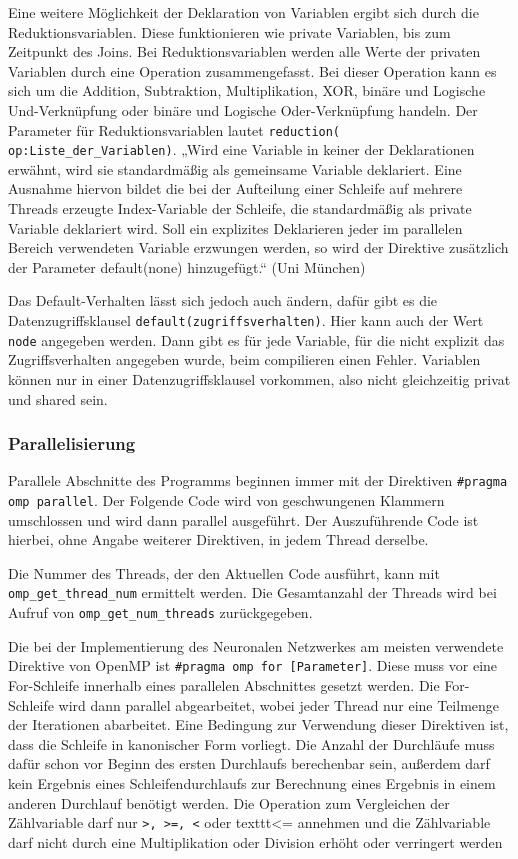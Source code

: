 \documentclass[../main.tex]{subfiles}
\begin{document}
Eine weitere Möglichkeit der Deklaration von Variablen ergibt sich durch die Reduktionsvariablen. Diese funktionieren wie private Variablen, bis zum Zeitpunkt des Joins. Bei Reduktionsvariablen werden alle Werte der privaten Variablen durch eine Operation zusammengefasst. Bei dieser Operation kann es sich um die Addition, Subtraktion, Multiplikation, XOR, binäre und Logische Und-Verknüpfung oder binäre und Logische Oder-Verknüpfung handeln. Der Parameter für Reduktionsvariablen lautet \texttt{reduction( op:Liste\_der\_Variablen)}.
„Wird eine Variable in keiner der Deklarationen erwähnt, wird sie standardmäßig als gemeinsame Variable deklariert. Eine Ausnahme hiervon bildet die bei der Aufteilung einer Schleife auf mehrere Threads erzeugte Index-Variable der Schleife, die standardmäßig als private Variable deklariert wird. Soll ein explizites Deklarieren jeder im parallelen Bereich verwendeten Variable erzwungen werden, so wird der Direktive zusätzlich der Parameter default(none) hinzugefügt.“ (Uni München)

Das Default-Verhalten lässt sich jedoch auch ändern, dafür gibt es die Datenzugriffsklausel \texttt{default(zugriffsverhalten)}. Hier kann auch der Wert \texttt{node} angegeben werden. Dann gibt es für jede Variable, für die nicht explizit das Zugriffsverhalten angegeben wurde, beim compilieren einen Fehler.
Variablen können nur in einer Datenzugriffsklausel vorkommen, also nicht gleichzeitig privat und shared sein.

\subsubsection{Parallelisierung}

Parallele Abschnitte des Programms beginnen immer mit der Direktiven \texttt{\#pragma omp parallel}. Der Folgende Code wird von geschwungenen Klammern umschlossen und wird dann parallel ausgeführt. Der Auszuführende Code ist hierbei, ohne Angabe weiterer Direktiven, in jedem Thread derselbe. 

Die Nummer des Threads, der den Aktuellen Code ausführt, kann mit \texttt{omp\_get\_thread\_num} ermittelt werden. Die Gesamtanzahl der Threads wird bei Aufruf von \texttt{omp\_get\_num\_threads} zurückgegeben.

Die bei der Implementierung des Neuronalen Netzwerkes am meisten verwendete Direktive von OpenMP ist \texttt{\#pragma omp for [Parameter]}. Diese muss vor eine For-Schleife innerhalb eines parallelen Abschnittes gesetzt werden. Die For-Schleife wird dann parallel abgearbeitet, wobei jeder Thread nur eine Teilmenge der Iterationen abarbeitet. Eine Bedingung zur Verwendung dieser Direktiven ist, dass die Schleife in kanonischer Form vorliegt. Die Anzahl der Durchläufe muss dafür schon vor Beginn des ersten Durchlaufs berechenbar sein, außerdem darf kein Ergebnis eines Schleifendurchlaufs zur Berechnung eines Ergebnis in einem anderen Durchlauf benötigt werden. Die Operation zum Vergleichen der Zählvariable darf nur \texttt{>, >=, <} oder texttt{<=} annehmen und die Zählvariable darf nicht durch eine Multiplikation oder Division erhöht oder verringert werden
\end{document}
